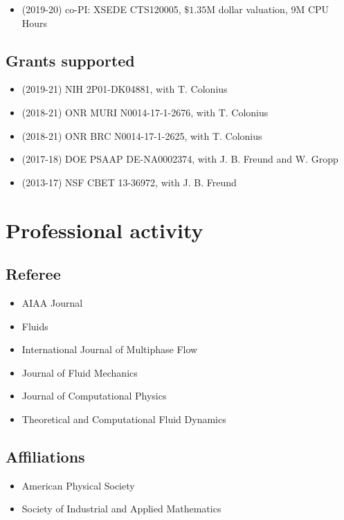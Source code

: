 \begin{itemize}
    \item (2019-20) co-PI: XSEDE CTS120005, $\$1.35$M dollar valuation, 9M CPU Hours
\end{itemize}

\subsection{Grants supported}

\begin{itemize}
    \item (2019-21) NIH 2P01-DK04881, with T. Colonius
    \item (2018-21) ONR MURI N0014-17-1-2676, with T. Colonius
    \item (2018-21) ONR BRC N0014-17-1-2625, with T. Colonius
    \item (2017-18) DOE PSAAP DE-NA0002374, with J. B. Freund and W. Gropp
    \item (2013-17) NSF CBET 13-36972, with J. B. Freund
\end{itemize}

\section{Professional activity}

\subsection{Referee}

\begin{itemize}
    \item AIAA Journal
    \item Fluids
    \item International Journal of Multiphase Flow
    \item Journal of Fluid Mechanics
    \item Journal of Computational Physics
    \item Theoretical and Computational Fluid Dynamics
\end{itemize}

\subsection{Affiliations}

\begin{itemize}
    \item American Physical Society
    \item Society of Industrial and Applied Mathematics
\end{itemize}

